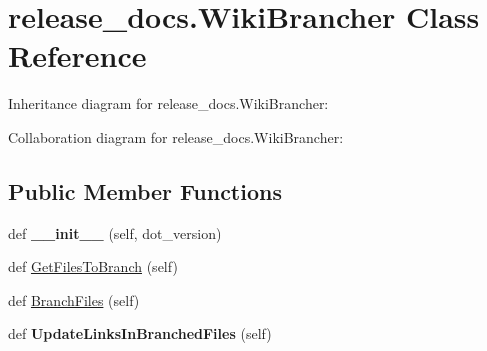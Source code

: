 \hypertarget{classrelease__docs_1_1WikiBrancher}{}\section{release\+\_\+docs.\+Wiki\+Brancher Class Reference}
\label{classrelease__docs_1_1WikiBrancher}


Inheritance diagram for release\+\_\+docs.\+Wiki\+Brancher\+:


Collaboration diagram for release\+\_\+docs.\+Wiki\+Brancher\+:
\subsection*{Public Member Functions}
\begin{DoxyCompactItemize}
\item 
\mbox{\label{classrelease__docs_1_1WikiBrancher_a344b32e2b65f0e8bab9fbf1e670d33fd}} 
def {\bfseries \+\_\+\+\_\+init\+\_\+\+\_\+} (self, dot\+\_\+version)
\item 
def \hyperlink{classrelease__docs_1_1WikiBrancher_a05fc4282f501fb0210ecb33fd1d209a6}{Get\+Files\+To\+Branch} (self)
\item 
def \hyperlink{classrelease__docs_1_1WikiBrancher_a5ef284f7e1742f465ecd0c14d2667327}{Branch\+Files} (self)
\item 
\mbox{\label{classrelease__docs_1_1WikiBrancher_aa0bc4b1b78426fe7a8496d570b540f1d}} 
def {\bfseries Update\+Links\+In\+Branched\+Files} (self)
\end{DoxyCompactItemize}
